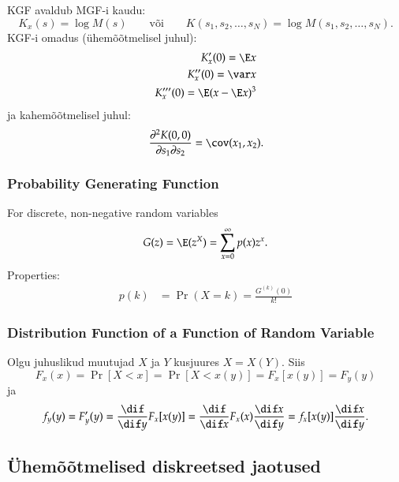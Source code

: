 \documentclass[a4paper]{article}
\numberwithin{equation}{subsection}
\begin{document}
KGF avaldub MGF-i kaudu:
\begin{equation}
K_x(s) = \log M(s) 
  \qquad \mbox{või} \qquad
K(s_1,s_2,\ldots,s_N) = \log M( s_1,s_2,\ldots,s_N).
\end{equation}
KGF-i omadus (ühemõõtmelisel juhul):
\begin{eqnarray}
K_x'(0) = \E x \\
K_x''(0) = \var x\\
K_x'''(0) = \E(x-\E x)^3
\end{eqnarray}
ja kahemõõtmelisel juhul:
\begin{equation}
\frac{\partial^2 K(0,0)}{\partial s_1 \partial s_2} =
  \cov( x_1, x_2).
\end{equation}


\subsubsection{Probability Generating Function}
\label{sec:probability_generating_function}

For discrete, non-negative random variables
\begin{equation}
  G(z) = \E (z^X) = \sum_{x=0}^{\infty}p(x)z^x.
\end{equation}
Properties:
\begin{align}
  p(k) &= \operatorname{Pr}(X = k) = \frac{G^{(k)}(0)}{k!}
\end{align}

\subsubsection{Distribution Function of a Function of Random Variable}
Olgu juhuslikud muutujad $X$ ja $Y$ kusjuures $X=X(Y)$.  Siis
\begin{equation}
  F_x(x) = \Pr[X < x] = \Pr[X < x(y)] = F_x[x(y)] = F_y(y)
\end{equation}
ja
\begin{equation}
  f_y(y) = F_y'(y) = \frac{\dif}{\dif y} F_x[x(y)] =
  \frac{\dif}{\dif x} F_x(x) \frac{\dif x}{\dif y} = f_x[x(y)]
  \frac{\dif x}{\dif y}. 
\end{equation}


\subsection{Ühemõõtmelised diskreetsed jaotused}
\end{document}
